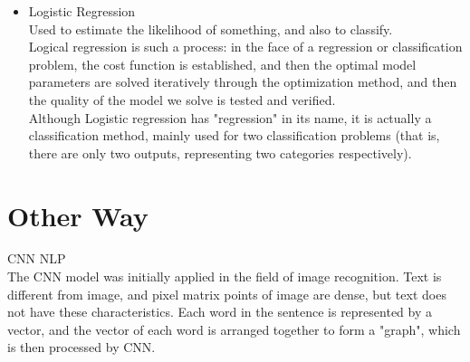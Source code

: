 \begin{itemize}
  \item  Logistic Regression\\
  Used to estimate the likelihood of something, and also to classify.\\
  Logical regression is such a process: in the face of a regression or classification problem,
   the cost function is established, and then the optimal model parameters are solved iteratively through the
    optimization method, and then the quality of the model we solve is tested and verified.\\
Although Logistic regression has "regression" in its name, it is actually a classification method, 
mainly used for two classification problems (that is, there are only two outputs, representing two categories respectively).



\end{itemize}





\section{Other Way} 
CNN NLP \\
  	The CNN model was initially applied in the field of image recognition. 
    Text is different from image, and pixel matrix points of image are dense, 
    but text does not have these characteristics. Each word in the sentence is represented 
    by a vector, and the vector of each word is arranged together to form a "graph", 
    which is then processed by CNN.


